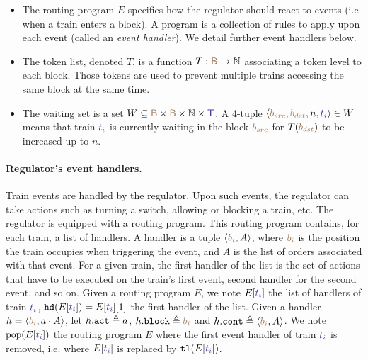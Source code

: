 \documentclass[runningheads]{llncs}
\newcommand{\Nat}{{\mbox{$\mathbb{N}$}}}
\newcommand{\tuple}[1]{\ensuremath{\langle #1\rangle}}
\newcommand{\posFmt}[1]{{\color{poscolor}{#1}}}
\newcommand{\blocks}{{\posFmt{\mathsf{B}}}}
\newcommand{\bid}[1]{\ensuremath{\posFmt{b_{#1}}}}
\newcommand{\trainFmt}[1]{{\color{traincolor} #1}}
\newcommand{\trains}{{\trainFmt{\mathsf{T}}}}
\newcommand{\tid}[1]{\ensuremath{\trainFmt{t_{#1}}}}
\newcommand{\handlerOf}[2]{\ensuremath{#1[\trainFmt{#2}]}}
\newcommand{\popHandlerHead}[2]{\ensuremath{{\tt pop}(#1[\trainFmt{#2}])}}
\newcommand{\actionsOf}[1]{\ensuremath{#1.{\tt act}}}
\newcommand{\blockOf}[1]{\ensuremath{#1.{\tt block}}}
\newcommand{\handler}[2]{\tuple{#1, #2}}
\newcommand{\nextAct}[1]{\ensuremath{#1.{\tt cont}}}
\newcommand{\tokens}{\ensuremath{T}}
\newcommand{\tokenOf}[1]{\ensuremath{T(\posFmt{#1})}}
\newcommand{\incrToken}[2]{\ensuremath{#1. {\tt incr}(\posFmt{#2})}}
\newcommand{\bufferFmt}[1]{#1}
\newcommand{\head}[1]{\ensuremath{{\tt hd}(#1)}}
\newcommand{\buftail}[1]{\ensuremath{{\tt tl}(\bufferFmt{#1})}}
\begin{document}
\begin{itemize}
	\item The routing program $E$ specifies how the regulator should react to events (i.e. when a train enters a block). A program is a collection of rules to apply upon each event (called an \emph{event handler}). We detail further event handlers below.
	\item The token list, denoted $\tokens$, is a function  $\tokens: \blocks \to \Nat$ associating a token level to each block. Those tokens are used to prevent multiple trains accessing the same block at the same time.
	\item The waiting set is a set $W \subseteq \blocks \times \blocks \times \Nat \times \trains$. A 4-tuple $\tuple{\bid{src}, \bid{dst}, n, \tid{i}} \in W$ means that train \tid{i} is currently waiting in the block \bid{src} for $\tokenOf{\bid{dst}}$ to be increased up to $n$.
\end{itemize}


\paragraph{Regulator's event handlers.}

Train events are handled by the regulator. Upon such events, the regulator can take actions such as turning a switch, allowing or blocking a train, etc. The regulator is equipped with a routing program. This routing program contains, for each train, a list of handlers. A handler is a tuple $\tuple{\bid{i}, A}$, where $\bid{i}$ is the position the train occupies when triggering the event, and $A$ is the list of orders associated with that event. For a given train, the first handler of the list is the set of actions that have to be executed on the train's first event, second handler for the second event, and so on.
Given a routing program $E$, we note $\handlerOf{E}{\tid{i}}$ the list of handlers of train $\tid{i}$, $\head{\handlerOf{E}{\tid{i}}} = \handlerOf{E}{\tid{i}}[1]$ the first handler of the list. Given a handler $h = \tuple{\bid{i}, a \cdot A}$, let  $\actionsOf{h} \triangleq a$, $\blockOf{h} \triangleq \bid{i}$ and $\nextAct{h} \triangleq \tuple{\bid{i}, A}$.  %
 We note $\popHandlerHead{E}{\tid{i}}$ the routing program $E$ where the first event handler of train \tid{i} is removed, i.e. where $\handlerOf{E}{\tid{i}}$ is replaced by $\buftail{\handlerOf{E}{\tid{i}}}$.
\end{document}
